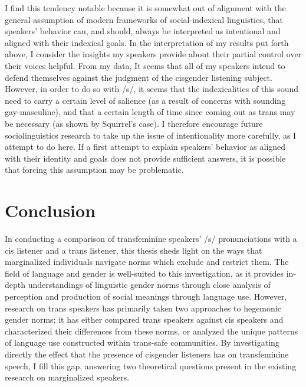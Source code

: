 \documentclass[12pt,twoside]{reedthesis}
\begin{document}
I find this tendency notable because it is somewhat out of alignment with the general assumption of modern frameworks of social-indexical linguistics, that speakers' behavior can, and should, always be interpreted as intentional and aligned with their indexical goals. In the interpretation of my results put forth above, I consider the insights my speakers provide about their partial control over their voices helpful. From my data, It seems that all of my speakers intend to defend themselves against the judgment of the cisgender listening subject. However, in order to do so with /s/, it seems that the indexicalities of this sound need to carry a certain level of salience (as a result of concerns with sounding gay-masculine), and that a certain length of time since coming out as trans may be necessary (as shown by Squirrel's case). I therefore encourage future sociolinguistics research to take up the issue of intentionality more carefully, as I attempt to do here. If a first attempt to explain speakers' behavior as aligned with their identity and goals does not provide sufficient answers, it is possible that forcing this assumption may be problematic.


\chapter*{Conclusion}
	\setcounter{chapter}{5}

In conducting a comparison of transfeminine speakers' /s/ pronunciations with a cis listener and a trans listener, this thesis sheds light on the ways that marginalized individuals navigate norms which exclude and restrict them. The field of language and gender is well-suited to this investigation, as it provides in-depth understandings of linguistic gender norms through close analysis of perception and production of social meanings through language use. However, research on trans speakers has primarily taken two approaches to hegemonic gender norms; it has either compared trans speakers against cis speakers and characterized their differences from these norms, or analyzed the unique patterns of language use constructed within trans-safe communities. By investigating directly the effect that the presence of cisgender listeners has on transfeminine speech, I fill this gap, answering two theoretical questions present in the existing research on marginalized speakers.
\end{document}

